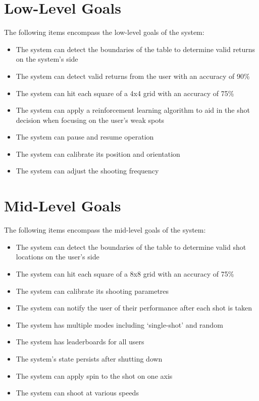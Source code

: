\documentclass[11pt]{article}
\begin{document}
\section{Low-Level Goals}
The following items encompass the low-level goals of the system:
\begin{itemize}
\item The system can detect the boundaries of the table to determine valid returns on the system's side
\item The system can detect valid returns from the user with an accuracy of 90\%
\item The system can hit each square of a 4x4 grid with an accuracy of 75\%
\item The system can apply a reinforcement learning algorithm to aid in the shot decision when focusing on the user's weak spots
\item The system can pause and resume operation
\item The system can calibrate its position and orientation
\item The system can adjust the shooting frequency
\end{itemize}
\section{Mid-Level Goals}
The following items encompass the mid-level goals of the system:
\begin{itemize}
\item The system can detect the boundaries of the table to determine valid shot locations on the user's side
\item The system can hit each square of a 8x8 grid with an accuracy of 75\%
\item The system can calibrate its shooting parametres
\item The system can notify the user of their performance after each shot is taken
\item The system has multiple modes including `single-shot' and random
\item The system has leaderboards for all users
\item The system's state persists after shutting down
\item The system can apply spin to the shot on one axis
\item The system can shoot at various speeds
\end{itemize}
\end{document}
